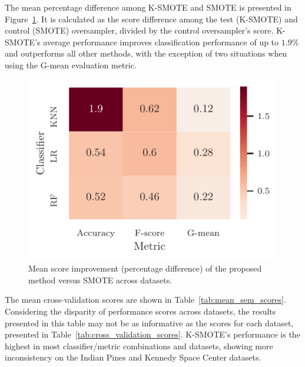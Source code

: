 \documentclass[parskip=full]{scrartcl}
\begin{document}

The mean percentage difference among K-SMOTE and SMOTE is presented in
Figure~\ref{fig:mean_score_improvement_heatmap}. It is calculated as the score
difference among the test (K-SMOTE) and control (SMOTE) oversampler, divided by
the control oversampler's score. K-SMOTE's average performance improves
classification performance of up to $1.9\%$ and outperforms all other methods,
with the exception of two situations when using the G-mean evaluation metric.

\begin{figure}[H]
	\centering
	\includegraphics[height=.4\linewidth]{../analysis/mean_score_improvement_heatmap}
    \caption{Mean score improvement (percentage difference) of the proposed method versus
        SMOTE across datasets.
        }\label{fig:mean_score_improvement_heatmap}
\end{figure}

The mean cross-validation scores are shown in Table~\ref{tab:mean_sem_scores}.
Considering the disparity of performance scores across datasets, the results
presented in this table may not be as informative as the scores for each
dataset, presented in Table~\ref{tab:cross_validation_scores}. K-SMOTE's
performance is the highest in most classifier/metric combinations and datasets,
showing more inconsistency on the Indian Pines and Kennedy Space Center
datasets.

\end{document}
